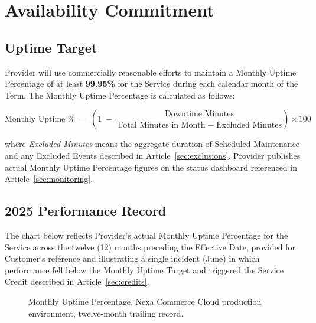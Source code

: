 \section{Availability Commitment}
\label{sec:availability}

\subsection{Uptime Target}
Provider will use commercially reasonable efforts to maintain a Monthly Uptime Percentage of at least \textbf{99.95\%} for the Service during each calendar month of the Term. The Monthly Uptime Percentage is calculated as follows:

\[
\text{Monthly Uptime \%} \;=\; \left(1 \;-\; \frac{\text{Downtime Minutes}}{\text{Total Minutes in Month} \;-\; \text{Excluded Minutes}}\right) \times 100
\]

\noindent where \emph{Excluded Minutes} means the aggregate duration of Scheduled Maintenance and any Excluded Events described in Article~\ref{sec:exclusions}. Provider publishes actual Monthly Uptime Percentage figures on the status dashboard referenced in Article~\ref{sec:monitoring}.

\subsection{2025 Performance Record}
\label{sec:performance-record}
The chart below reflects Provider's actual Monthly Uptime Percentage for the Service across the twelve (12) months preceding the Effective Date, provided for Customer's reference and illustrating a single incident (June) in which performance fell below the Monthly Uptime Target and triggered the Service Credit described in Article~\ref{sec:credits}.

\begin{figure}[H]
\centering
{}
\caption{Monthly Uptime Percentage, Nexa Commerce Cloud production environment, twelve-month trailing record.}
\label{fig:uptime}
\end{figure}

